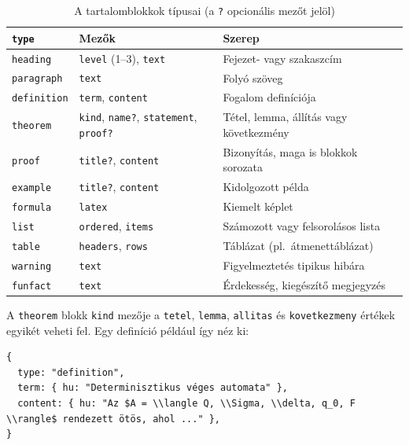 \begin{table}[htbp]
    \centering
    \begin{tabularx}{\textwidth}{l p{4.6cm} X}
        \toprule
        \textbf{\texttt{type}} & \textbf{Mezők} & \textbf{Szerep} \\
        \midrule
        \texttt{heading}    & \texttt{level} (1--3), \texttt{text}
                            & Fejezet- vagy szakaszcím \\
        \texttt{paragraph}  & \texttt{text}
                            & Folyó szöveg \\
        \texttt{definition} & \texttt{term}, \texttt{content}
                            & Fogalom definíciója \\
        \texttt{theorem}    & \texttt{kind}, \texttt{name?},
                              \texttt{statement}, \texttt{proof?}
                            & Tétel, lemma, állítás vagy következmény \\
        \texttt{proof}      & \texttt{title?}, \texttt{content}
                            & Bizonyítás, maga is blokkok sorozata \\
        \texttt{example}    & \texttt{title?}, \texttt{content}
                            & Kidolgozott példa \\
        \texttt{formula}    & \texttt{latex}
                            & Kiemelt képlet \\
        \texttt{list}       & \texttt{ordered}, \texttt{items}
                            & Számozott vagy felsorolásos lista \\
        \texttt{table}      & \texttt{headers}, \texttt{rows}
                            & Táblázat (pl.\ átmenettáblázat) \\
        \texttt{warning}    & \texttt{text}
                            & Figyelmeztetés tipikus hibára \\
        \texttt{funfact}    & \texttt{text}
                            & Érdekesség, kiegészítő megjegyzés \\
        \bottomrule
    \end{tabularx}
    \caption{A tartalomblokkok típusai (a \texttt{?} opcionális mezőt jelöl)}
    \label{tab:blocks}
\end{table}

A \texttt{theorem} blokk \texttt{kind} mezője a
\texttt{tetel}, \texttt{lemma}, \texttt{allitas} és
\texttt{kovetkezmeny} értékek egyikét veheti fel. Egy definíció például
így néz ki:

\begin{lstlisting}
{
  type: "definition",
  term: { hu: "Determinisztikus véges automata" },
  content: { hu: "Az $A = \\langle Q, \\Sigma, \\delta, q_0, F \\rangle$ rendezett ötös, ahol ..." },
}
\end{lstlisting}

